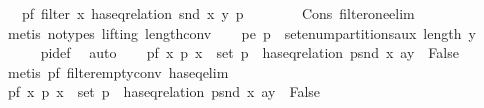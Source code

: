 \begin{isabellebody}
\ \ \ p{}{\isacharunderscore}{\kern0pt}f{}{\isacharcolon}{\kern0pt}\ {\isachardoublequoteopen}filter\ {\isacharparenleft}{\kern0pt}{\isasymlambda}x{\isachardot}{\kern0pt}\ has{\isacharunderscore}{\kern0pt}eq{\isacharunderscore}{\kern0pt}relation\ {\isacharparenleft}{\kern0pt}snd\ x{\isacharparenright}{\kern0pt}\ y{\isacharparenright}{\kern0pt}\ p{}\ {\isacharequal}{\kern0pt}\ {\isacharbrackleft}{\kern0pt}{\isacharbrackright}{\kern0pt}{\isachardoublequoteclose}\isanewline
\ \ \ \ \isamarkupfalse%
\ Cons\ filter{\isacharunderscore}{\kern0pt}one{\isacharunderscore}{\kern0pt}elim\ \isamarkupfalse%
\ {\isacharparenleft}{\kern0pt}metis\ {\isacharparenleft}{\kern0pt}no{\isacharunderscore}{\kern0pt}types{\isacharcomma}{\kern0pt}\ lifting{\isacharparenright}{\kern0pt}\ length{\isacharunderscore}{\kern0pt}{}{\isacharunderscore}{\kern0pt}conv{\isacharparenright}{\kern0pt}\isanewline
\ \ \isamarkupfalse%
\ p{}{\isacharunderscore}{\kern0pt}e{\isacharcolon}{\kern0pt}\ {\isachardoublequoteopen}p{}\ {\isasymin}\ set{\isacharparenleft}{\kern0pt}enum{\isacharunderscore}{\kern0pt}partitions{\isacharunderscore}{\kern0pt}aux\ {\isacharparenleft}{\kern0pt}length\ y{\isacharparenright}{\kern0pt}{\isacharparenright}{\kern0pt}{\isachardoublequoteclose}\ \isanewline
\ \ \ \ \isamarkupfalse%
\ pi{\isacharunderscore}{\kern0pt}def\ \isamarkupfalse%
\ auto\isanewline
\ \ \isamarkupfalse%
\ p{}{\isacharunderscore}{\kern0pt}f{\isacharcolon}{\kern0pt}\ {\isachardoublequoteopen}{\isasymAnd}x\ p{\isachardot}{\kern0pt}\ x\ {\isasymin}\ set\ p{}\ {\isasymLongrightarrow}\ has{\isacharunderscore}{\kern0pt}eq{\isacharunderscore}{\kern0pt}relation\ {\isacharparenleft}{\kern0pt}p{\isacharhash}{\kern0pt}{\isacharparenleft}{\kern0pt}snd\ x{\isacharparenright}{\kern0pt}{\isacharparenright}{\kern0pt}\ {\isacharparenleft}{\kern0pt}a{\isacharhash}{\kern0pt}y{\isacharparenright}{\kern0pt}\ {\isacharequal}{\kern0pt}\ False{\isachardoublequoteclose}\isanewline
\ \ \ \ \isamarkupfalse%
\ {\isacharparenleft}{\kern0pt}metis\ p{}{\isacharunderscore}{\kern0pt}f{}\ filter{\isacharunderscore}{\kern0pt}empty{\isacharunderscore}{\kern0pt}conv\ has{\isacharunderscore}{\kern0pt}eq{\isacharunderscore}{\kern0pt}elim{\isacharparenright}{\kern0pt}\isanewline
\ \ \isamarkupfalse%
\ p{}{\isacharunderscore}{\kern0pt}f{\isacharcolon}{\kern0pt}\ {\isachardoublequoteopen}{\isasymAnd}x\ p{\isachardot}{\kern0pt}\ x\ {\isasymin}\ set\ p{}\ {\isasymLongrightarrow}\ has{\isacharunderscore}{\kern0pt}eq{\isacharunderscore}{\kern0pt}relation\ {\isacharparenleft}{\kern0pt}p{\isacharhash}{\kern0pt}{\isacharparenleft}{\kern0pt}snd\ x{\isacharparenright}{\kern0pt}{\isacharparenright}{\kern0pt}\ {\isacharparenleft}{\kern0pt}a{\isacharhash}{\kern0pt}y{\isacharparenright}{\kern0pt}\ {\isacharequal}{\kern0pt}\ False{\isachardoublequoteclose}\isanewline

\end{isabellebody}
